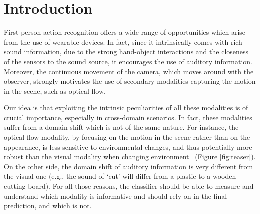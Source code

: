 \section{Introduction}

First person action recognition offers a wide range of opportunities which arise from the use of wearable devices. In fact, since it intrinsically comes with rich sound information, due to the strong hand-object interactions and the closeness of the sensors to the sound source, it encourages the use of auditory information. Moreover, the continuous movement of the camera, which moves around with the observer, strongly motivates the use of secondary modalities capturing the motion in the scene, such as optical flow. %

Our idea is that exploiting the intrinsic peculiarities of all these modalities is of crucial importance, especially in cross-domain scenarios. In fact, these modalities suffer from a domain shift which is not of the same nature. For instance, the optical flow modality, by focusing on the motion in the scene rather than on the appearance, is less sensitive to environmental changes, and thus potentially more robust than the visual modality when changing environment~\cite{munro2020multi} (Figure \ref{fig:teaser}). On the other side, the domain shift of auditory information is very different from the visual one (e.g., the sound of ‘cut' will differ from a plastic to a wooden cutting board). For all those reasons, the classifier should be able to measure and understand which modality is informative and should rely on in the final prediction, and which is not.

